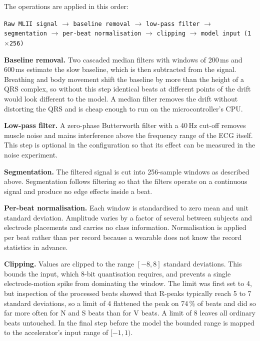 The operations are applied in this order:

\begin{center}
\texttt{Raw MLII signal}
$\rightarrow$ \texttt{baseline removal}
$\rightarrow$ \texttt{low-pass filter}
$\rightarrow$ \texttt{segmentation}
$\rightarrow$ \texttt{per-beat normalisation}
$\rightarrow$ \texttt{clipping}
$\rightarrow$ \texttt{model input (1$\times$256)}
\end{center}

\textbf{Baseline removal.} Two cascaded median filters with windows of 200\,ms and 600\,ms estimate the slow baseline, which is then subtracted from the signal. Breathing and body movement shift the baseline by more than the height of a QRS complex, so without this step identical beats at different points of the drift would look different to the model. A median filter removes the drift without distorting the QRS and is cheap enough to run on the microcontroller's CPU.

\textbf{Low-pass filter.} A zero-phase Butterworth filter with a 40\,Hz cut-off removes muscle noise and mains interference above the frequency range of the ECG itself. This step is optional in the configuration so that its effect can be measured in the noise experiment.

\textbf{Segmentation.} The filtered signal is cut into 256-sample windows as described above. Segmentation follows filtering so that the filters operate on a continuous signal and produce no edge effects inside a beat.

\textbf{Per-beat normalisation.} Each window is standardised to zero mean and unit standard deviation. Amplitude varies by a factor of several between subjects and electrode placements and carries no class information. Normalisation is applied per beat rather than per record because a wearable does not know the record statistics in advance.

\textbf{Clipping.} Values are clipped to the range $[-8, 8]$ standard deviations. This bounds the input, which 8-bit quantisation requires, and prevents a single electrode-motion spike from dominating the window. The limit was first set to 4, but inspection of the processed beats showed that R-peaks typically reach 5 to 7 standard deviations, so a limit of 4 flattened the peak on 74\,\% of beats and did so far more often for N and S beats than for V beats. A limit of 8 leaves all ordinary beats untouched. In the final step before the model the bounded range is mapped to the accelerator's input range of $[-1, 1)$.

